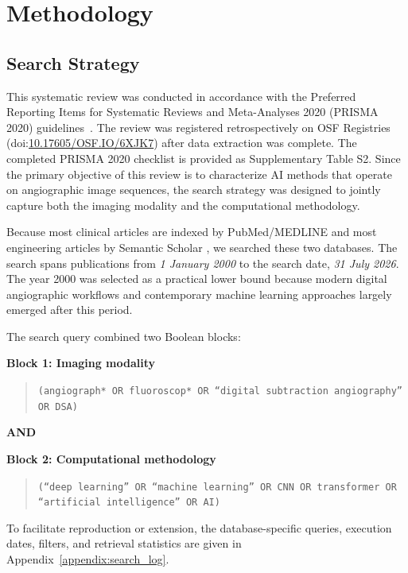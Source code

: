 \section{Methodology}
\subsection{Search Strategy}
\label{sec:search}
This systematic review was conducted in accordance with the Preferred Reporting Items for Systematic Reviews and Meta-Analyses 2020 (PRISMA 2020) guidelines~\cite{Page2021PRISMA}. The review was registered retrospectively on OSF Registries (doi:\href{https://doi.org/10.17605/OSF.IO/6XJK7}{10.17605/OSF.IO/6XJK7}) after data extraction was complete. The completed PRISMA 2020 checklist is provided as Supplementary Table S2. Since the primary objective of this review is to characterize AI methods that operate on angiographic image sequences, the search strategy was designed to jointly capture both the imaging modality and the computational methodology.


Because most clinical articles are indexed by PubMed/\allowbreak MEDLINE \cite{white2020pubmed} and most engineering articles by Semantic Scholar \cite{fricke2018semantic}, we searched these two databases. The search spans publications from \textit{1 January 2000} to the search date, \textit{31 July 2026}. The year 2000 was selected as a practical lower bound because modern digital angiographic workflows and contemporary machine learning approaches largely emerged after this period.

The search query combined two Boolean blocks:

\medskip
\noindent\begin{minipage}{\linewidth}
\noindent\textbf{Block 1: Imaging modality}
\begin{quote}
\small\texttt{(angiograph* OR fluoroscop* OR ``digital subtraction angiography'' OR DSA)}
\end{quote}

\noindent\textbf{AND}

\noindent\textbf{Block 2: Computational methodology}
\begin{quote}
\small\texttt{(``deep learning'' OR ``machine learning'' OR CNN OR transformer OR ``artificial intelligence'' OR AI)}
\end{quote}
\end{minipage}
\medskip


To facilitate reproduction or extension, the database-specific queries, execution dates, filters, and retrieval statistics are given in Appendix~\ref{appendix:search_log}.


